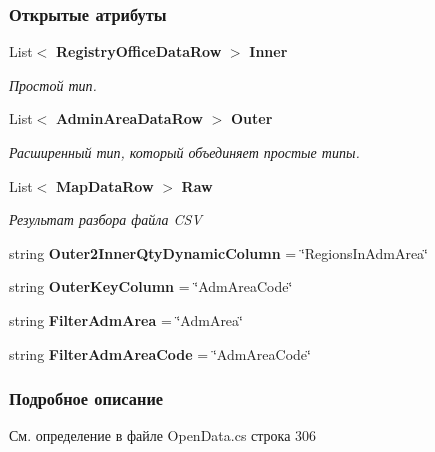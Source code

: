 \subsubsection*{Открытые атрибуты}
\begin{DoxyCompactItemize}
\item 
List$<$ {\bf Registry\+Office\+Data\+Row} $>$ {\bf Inner}
\begin{DoxyCompactList}\small\item\em Простой тип. \end{DoxyCompactList}\item 
List$<$ {\bf Admin\+Area\+Data\+Row} $>$ {\bf Outer}
\begin{DoxyCompactList}\small\item\em Расширенный тип, который объединяет простые типы. \end{DoxyCompactList}\item 
List$<$ {\bf Map\+Data\+Row} $>$ {\bf Raw}
\begin{DoxyCompactList}\small\item\em Результат разбора файла C\+S\+V \end{DoxyCompactList}\item 
string {\bfseries Outer2\+Inner\+Qty\+Dynamic\+Column} = \char`\"{}Regions\+In\+Adm\+Area\char`\"{}\label{classkdz__manager_1_1_open_data_a93728bb726e51b49493c8628f2037c94}

\item 
string {\bfseries Outer\+Key\+Column} = \char`\"{}Adm\+Area\+Code\char`\"{}\label{classkdz__manager_1_1_open_data_a8190edc858cdfea68fb72782608ea6f8}

\item 
string {\bfseries Filter\+Adm\+Area} = \char`\"{}Adm\+Area\char`\"{}\label{classkdz__manager_1_1_open_data_a5fc102f36a819b3bc81627a8d931ab3e}

\item 
string {\bfseries Filter\+Adm\+Area\+Code} = \char`\"{}Adm\+Area\+Code\char`\"{}\label{classkdz__manager_1_1_open_data_afd6b740ac445668267e4f69729b7d391}

\end{DoxyCompactItemize}


\subsubsection{Подробное описание}


См. определение в файле Open\+Data.\+cs строка 306



